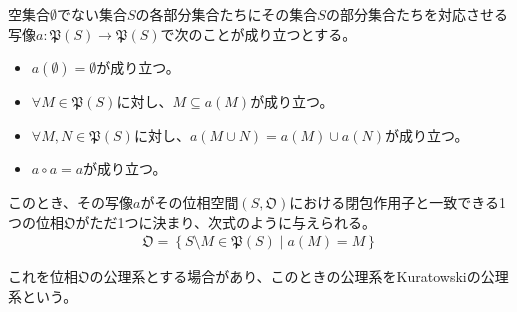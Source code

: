 \documentclass[dvipdfmx]{jsarticle}
\begin{document}
\begin{thm}\label{8.1.1.14}
空集合$\emptyset$でない集合$S$の各部分集合たちにその集合$S$の部分集合たちを対応させる写像$a:\mathfrak{P}(S)\mathfrak{\rightarrow P}(S)$で次のことが成り立つとする。
\begin{itemize}
\item
  $a(\emptyset) = \emptyset$が成り立つ。
\item
  $\forall M \in \mathfrak{P}(S)$に対し、$M \subseteq a(M)$が成り立つ。
\item
  $\forall M,N \in \mathfrak{P}(S)$に対し、$a(M \cup N) = a(M) \cup a(N)$が成り立つ。
\item
  $a \circ a = a$が成り立つ。
\end{itemize}
このとき、その写像$aがその位相空間\left( S,\mathfrak{O} \right)$における閉包作用子と一致できる1つの位相$\mathfrak{O}$がただ1つに決まり、次式のように与えられる。
\begin{align*}
\mathfrak{O}=\left\{ S \setminus M \in \mathfrak{P}(S) \middle| a(M) = M \right\}
\end{align*}
\end{thm}\par
これを位相$\mathfrak{O}$の公理系とする場合があり、このときの公理系をKuratowskiの公理系という。
\end{document}
